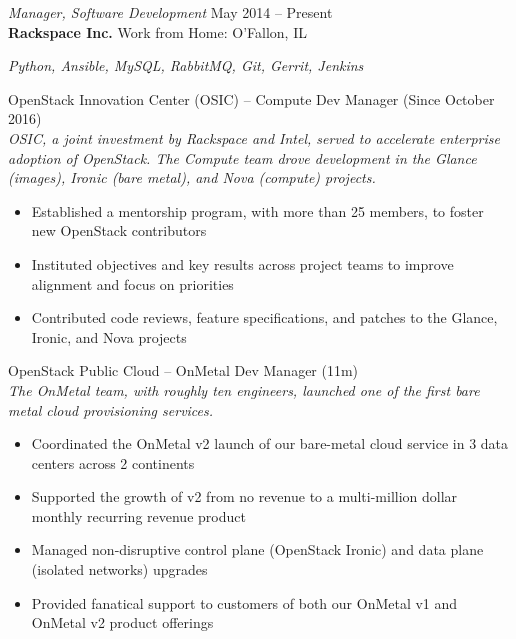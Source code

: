 \documentclass[margin,line]{resume}
\begin{document}
\begin{resume}
{\sl Manager, Software Development} \hfill
     May 2014 -- Present\\
     \textbf{Rackspace Inc.} \hfill
     Work from Home: O'Fallon, IL\\[4pt]
{\small\centering\textit{Python, Ansible, MySQL, RabbitMQ, Git, Gerrit, Jenkins}\par}\vspace*{-\baselineskip}
\vspace{4pt}
{\small OpenStack Innovation Center (OSIC) -- Compute  \hfill  Dev Manager (Since October 2016)}\\
{\small\textit{OSIC, a joint investment by Rackspace and Intel, served to accelerate enterprise adoption of OpenStack.
The Compute team drove development in the Glance (images), Ironic (bare metal), and Nova (compute) projects.}}
\begin{itemize} \itemsep -2pt %
\small\item Established a mentorship program, with more than 25 members, to foster new OpenStack contributors
\small\item Instituted objectives and key results across project teams to improve alignment and focus on priorities
\small\item Contributed code reviews, feature specifications, and patches to the Glance, Ironic, and Nova projects
\end{itemize}\vspace*{-\baselineskip} %
\vspace{4pt}
{\small OpenStack Public Cloud -- OnMetal  \hfill  Dev Manager (11m)}\\
{\small\textit{The OnMetal team, with roughly ten engineers, launched one of the first bare metal cloud provisioning services.}}
\begin{itemize} \itemsep -2pt %
\small\item Coordinated the OnMetal v2 launch of our bare-metal cloud service in 3 data centers across 2 continents
\small\item Supported the growth of v2 from no revenue to a multi-million dollar monthly recurring revenue product
\small\item Managed non-disruptive control plane (OpenStack Ironic) and data plane (isolated networks) upgrades
\small\item Provided fanatical support to customers of both our OnMetal v1 and OnMetal v2 product offerings
\end{itemize}\vspace{-\baselineskip} %

\end{resume}
\end{document}
